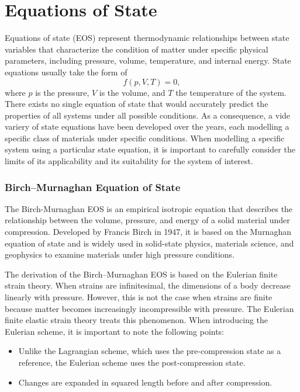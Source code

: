 \chapter{Equations of State}

Equations of state (EOS) represent thermodynamic relationships between state
variables that characterize the condition of matter under specific physical
parameters, including pressure, volume, temperature, and internal energy.
State equations usually take the form of
\begin{equation}
  f(p, V, T) = 0,
\end{equation}
where $p$ is the pressure, $V$ is the volume, and $T$ the temperature of the
system. There exists no single equation of state that would accurately
predict the properties of all systems under all possible conditions. As a
consequence, a vide variery of state equations have been developed over the
years, each modelling a specific class of materials under specific conditions.
When modelling a specific system using a particular state equation, it is
important to carefully consider the limits of its applicability and its
suitability for the system of interest.

\subsection{Birch--Murnaghan Equation of State}

The Birch-Murnaghan EOS is an empirical isotropic equation that describes the
relationship between the volume, pressure, and energy of a solid material
under compression. Developed by Francis Birch in 1947, it is based on the
Murnaghan equation of state and is widely used in solid-state physics,
materials science, and geophysics to examine materials under high pressure
conditions.

The derivation of the Birch--Murnaghan EOS is based on the Eulerian finite
strain theory. When strains are infinitesimal, the dimensions of a body
decrease linearly with pressure. However, this is not the case when strains
are finite because matter becomes increasingly incompressible with pressure.
The Eulerian finite elastic strain theory treats this phenomenon. When
introducing the Eulerian scheme, it is important to note the following points:
\begin{itemize}
  \item Unlike the Lagrangian scheme, which uses the pre-compression state as
  a reference, the Eulerian scheme uses the post-compression state.
  \item Changes are expanded in squared length before and after compression.
\end{itemize}


